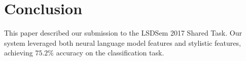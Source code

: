 \documentclass[11pt]{article}
\newcommand{\com}[1]{}
\begin{document}

\section{Conclusion}
This paper described our submission to the LSDSem 2017 Shared Task. 
Our system leveraged both neural language model features and  stylistic features, achieving $75.2\%$ accuracy on the classification task. 
\com{While we achieved state of the art performance, we still only achieved 75\% accuracy. 
This means the task is far from being solved. 
We need better tools to understand the common sense knowledge embedded in these stories.}



\end{document}
